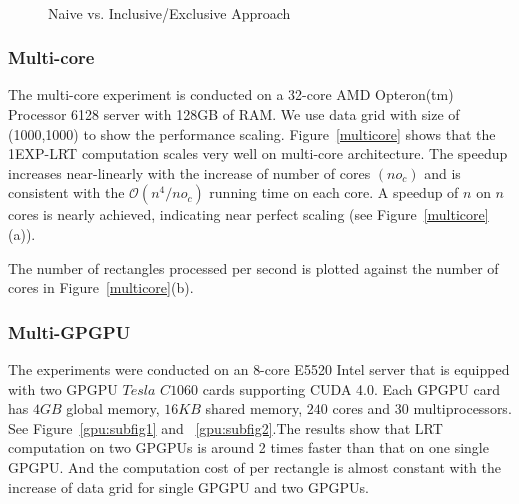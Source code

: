 \documentclass[AMA,LATO1COL]{WileyNJD-v2}
\newcommand\bigo{\mathcal O}
\begin{document}
\begin{figure}[h]
\centering
{}
~~
\caption{Naive vs. Inclusive/Exclusive Approach}\label{fast}
\end{figure}


\subsubsection{Multi-core}
 The multi-core experiment is conducted on a 32-core AMD Opteron(tm) Processor 6128 server with 128GB of RAM. We use data grid with size of (1000,1000) to show the performance scaling. Figure~\ref{multicore} shows that the 1EXP-LRT computation scales very well on multi-core architecture.  The speedup increases near-linearly with the increase of number of cores $(no_c)$ and is consistent with the $\bigo(n^4/no_c)$ running time on each core. A speedup of $n$ on $n$ cores is nearly achieved, indicating near perfect scaling (see Figure~\ref{multicore}(a)).

The number of rectangles processed per second is plotted against the number of cores in Figure~\ref{multicore}(b).


\subsubsection{Multi-GPGPU}
\noindent The experiments were conducted on an 8-core E5520 Intel server that
is equipped with two GPGPU $Tesla$ $C1060$ cards supporting CUDA 4.0.
Each GPGPU card has $4GB$ global memory, $16KB$ shared memory, $240$
cores and $30$ multiprocessors. See Figure~\ref{gpu:subfig1} and ~\ref{gpu:subfig2}.The results show
that LRT computation on two GPGPUs is around 2 times faster than that on one single GPGPU. And the computation
cost of per rectangle is almost constant with the increase
of data grid for single GPGPU and two GPGPUs.
\end{document}
